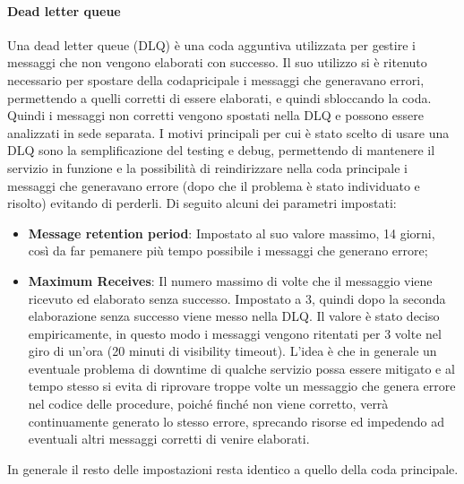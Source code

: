 \paragraph{Dead letter queue}
Una dead letter queue (DLQ) è una coda agguntiva utilizzata per gestire i messaggi che non vengono elaborati con successo.
Il suo utilizzo si è ritenuto necessario per spostare della codapricipale  i messaggi che generavano errori, permettendo a quelli corretti di essere elaborati, e quindi sbloccando la coda. Quindi i messaggi non corretti vengono spostati nella DLQ e possono essere analizzati in sede separata. I motivi principali per cui è stato scelto di usare una DLQ sono la semplificazione del testing e debug, permettendo di mantenere il servizio in funzione e la possibilità di reindirizzare nella coda principale i messaggi che generavano errore (dopo che il problema è stato individuato e risolto) evitando di perderli.
Di seguito alcuni dei parametri impostati:
\begin{itemize}
\item \textbf{Message retention period}: Impostato al suo valore massimo, 14 giorni, così da far pemanere più tempo possibile i messaggi che generano errore;
\item \textbf{Maximum Receives}:  Il numero massimo di volte che il messaggio viene ricevuto ed elaborato senza successo. Impostato a 3, quindi dopo la seconda elaborazione senza successo viene messo nella DLQ. Il valore è stato deciso empiricamente, in questo modo i messaggi vengono ritentati per 3 volte nel giro di un'ora (20 minuti di visibility timeout). L'idea è che in generale un eventuale problema di downtime di qualche servizio possa essere mitigato e al tempo stesso si evita di riprovare troppe volte un messaggio che genera errore nel codice delle procedure, poiché finché non viene corretto, verrà continuamente generato lo stesso errore, sprecando risorse ed impedendo ad eventuali altri messaggi corretti di venire elaborati. 
\end{itemize}
In generale il resto delle impostazioni resta identico a quello della coda principale.

